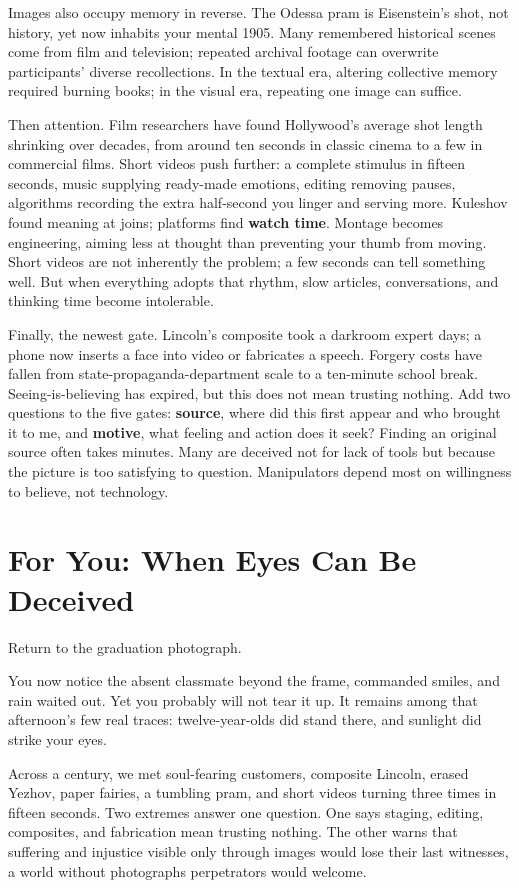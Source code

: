 Images also occupy memory in reverse. The Odessa pram is Eisenstein's shot, not history, yet now inhabits your mental 1905. Many remembered historical scenes come from film and television; repeated archival footage can overwrite participants' diverse recollections. In the textual era, altering collective memory required burning books; in the visual era, repeating one image can suffice.

Then attention. Film researchers have found Hollywood's average shot length shrinking over decades, from around ten seconds in classic cinema to a few in commercial films. Short videos push further: a complete stimulus in fifteen seconds, music supplying ready-made emotions, editing removing pauses, algorithms recording the extra half-second you linger and serving more. Kuleshov found meaning at joins; platforms find \textbf{watch time}. Montage becomes engineering, aiming less at thought than preventing your thumb from moving. Short videos are not inherently the problem; a few seconds can tell something well. But when everything adopts that rhythm, slow articles, conversations, and thinking time become intolerable.

Finally, the newest gate. Lincoln's composite took a darkroom expert days; a phone now inserts a face into video or fabricates a speech. Forgery costs have fallen from state-propaganda-department scale to a ten-minute school break. Seeing-is-believing has expired, but this does not mean trusting nothing. Add two questions to the five gates: \textbf{source}, where did this first appear and who brought it to me, and \textbf{motive}, what feeling and action does it seek? Finding an original source often takes minutes. Many are deceived not for lack of tools but because the picture is too satisfying to question. Manipulators depend most on willingness to believe, not technology.

\section{For You: When Eyes Can Be Deceived}
Return to the graduation photograph.

You now notice the absent classmate beyond the frame, commanded smiles, and rain waited out. Yet you probably will not tear it up. It remains among that afternoon's few real traces: twelve-year-olds did stand there, and sunlight did strike your eyes.

Across a century, we met soul-fearing customers, composite Lincoln, erased Yezhov, paper fairies, a tumbling pram, and short videos turning three times in fifteen seconds. Two extremes answer one question. One says staging, editing, composites, and fabrication mean trusting nothing. The other warns that suffering and injustice visible only through images would lose their last witnesses, a world without photographs perpetrators would welcome.

